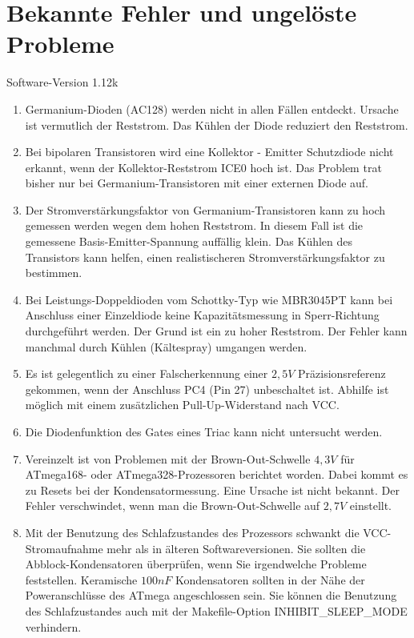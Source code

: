 
\chapter{Bekannte Fehler und ungelöste Probleme}
{\center Software-Version 1.12k}

\begin{enumerate}

\item Germanium-Dioden (AC128) werden nicht in allen Fällen entdeckt. Ursache ist vermutlich der Reststrom.
Das Kühlen der Diode reduziert den Reststrom.

\item Bei bipolaren Transistoren wird eine Kollektor - Emitter Schutzdiode nicht erkannt, wenn der
Kollektor-Reststrom ICE0 hoch ist. Das Problem trat bisher nur bei Germanium-Transistoren mit
einer externen Diode auf.

\item Der Stromverstärkungsfaktor von Germanium-Transistoren kann zu hoch gemessen werden wegen dem hohen Reststrom.
In diesem Fall ist die gemessene Basis-Emitter-Spannung auffällig klein.
Das Kühlen des Transistors kann helfen, einen realistischeren Stromverstärkungsfaktor zu bestimmen.

\item Bei Leistungs-Doppeldioden vom Schottky-Typ wie MBR3045PT kann bei Anschluss einer Einzeldiode keine Kapazitätsmessung in Sperr-Richtung 
durchgeführt werden. Der Grund ist ein zu hoher Reststrom. Der Fehler kann manchmal durch Kühlen (Kältespray) umgangen werden.

\item Es ist gelegentlich zu einer Falscherkennung einer \(2,5V\) Präzisionsreferenz gekommen, wenn der Anschluss PC4 (Pin 27) unbeschaltet ist.
Abhilfe ist möglich mit einem zusätzlichen Pull-Up-Widerstand nach VCC.

\item Die Diodenfunktion des Gates eines Triac kann nicht untersucht werden.

\item Vereinzelt ist von Problemen mit der Brown-Out-Schwelle \(4,3V\) für ATmega168- oder ATmega328-Prozessoren berichtet worden.
Dabei kommt es zu Resets bei der Kondensatormessung. Eine Ursache ist nicht bekannt.
Der Fehler verschwindet, wenn man die Brown-Out-Schwelle auf \(2,7V\) einstellt.

\item Mit der Benutzung des Schlafzustandes des Prozessors schwankt die VCC-Stromaufnahme mehr als
in älteren Softwareversionen.
Sie sollten die Abblock-Kondensatoren überprüfen, wenn Sie irgendwelche Probleme feststellen.
Keramische \(100nF\) Kondensatoren sollten in der Nähe der Poweranschlüsse des ATmega angeschlossen sein.
Sie können die Benutzung des Schlafzustandes auch mit der Makefile-Option INHIBIT\_SLEEP\_MODE verhindern.


\end{enumerate}

